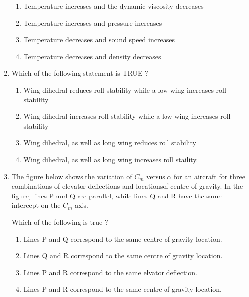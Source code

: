 \documentclass[journal,12pt,onecolumn]{IEEEtran}
\theoremstyle{remark}
\begin{document}
\begin{enumerate}
\begin{enumerate}
			\item Temperature increases and the dynamic viscosity decreases
			\item Temperature increases and pressure increases
			\item Temperature decreases and sound speed increases
			\item Temperature decreases and density decreases
		\end{enumerate}
	\item Which of the following statement is TRUE ?
		\begin{enumerate}
			\item Wing dihedral reduces roll stability while a low wing increases roll stability
			\item Wing dihedral increases roll stability while a low wing increases roll stability
			\item Wing dihedral, as well as long wing reduces roll stability
			\item Wing dihedral, as well as long wing increases roll staility.
		\end{enumerate}
	\item The figure below shows the variation of $C_m$ versus $\alpha$ for an aircraft for three combinations of elevator deflections and locationsof centre of gravity. In the figure, lines P and Q are parallel, while lines Q and R have the same intercept on the $C_m$ axis.
		
		Which of the following is true ?
		\begin{enumerate}
			\item Lines P and Q correspond to the same centre of gravity location.
			\item Lines Q and R correspond to the same centre of gravity location.
			\item Lines P and R correspond to the same elvator deflection.
			\item Lines P and R correspond to the same centre of gravity location.
		\end{enumerate}
\end{enumerate}
\end{document}
